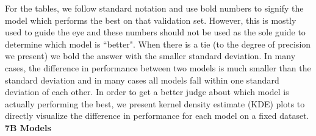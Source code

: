 \documentclass[11pt, oneside]{article}   	%
\begin{document}
For the  tables, we follow standard notation and use bold numbers to signify the model which performs the best on that validation set.
However, this is mostly used to guide the eye and these numbers should not be used as the sole guide to determine which model is ``better".
When there is a tie (to the degree of precision we present) we bold the answer with the smaller standard deviation.
In many cases, the difference in performance between two models is much smaller than the standard deviation and in many cases all models fall within one standard deviation of each other.
In order to get a better judge about which model is actually performing the best, we present kernel density estimate (KDE) plots to directly visualize the difference in performance for each model on a fixed dataset. 
\\[10pt]
\textbf{7B Models}
\\[10pt]
\end{document}
